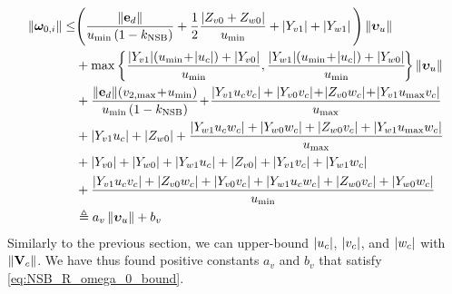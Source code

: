 \begin{equation}
\begin{split}
    \norm{\bs{\omega}_{0, i}} \leq &
    \Bigg(\frac{\norm{\mat{e}_d}}{u_{\min}\left(1 - k_{\rm NSB}\right)}
    + \frac{1}{2}\frac{\abs{Z_{v0} + Z_{w0}}}{u_{\min}} + \abs{Y_{v1}} + \abs{Y_{w1}}\Bigg) \norm{\bvel_u} \\
    &+ \max\left\{\frac{\abs{Y_{v1}}\!\left(u_{\min}\!+\!\abs{u_c}\right) + \abs{Y_{v0}}}{u_{\min}}, \frac{\abs{Y_{w1}}\!\left(u_{\min}\!+\!\abs{u_c}\right) + \abs{Y_{w0}}}{u_{\min}}\!\right\} \norm{\bvel_u} \\
    &+ \frac{\norm{\mat{e}_d}\!\left(\ivels_{2, \max}\! + \!u_{\min}\right)}{u_{\min}\left(1 - k_{\rm NSB}\right)}
    \!+\! \frac{\abs{Y_{v1}u_cv_c} + \abs{Y_{v0}v_c}\! + \!\abs{Z_{v0}w_c}\! + \!\abs{Y_{v1}u_{\max}v_c}}{u_{\max}} \\
    & + \abs{Y_{v1}u_c} + \abs{Z_{w0}} + \frac{\abs{Y_{w1}u_cw_c} + \abs{Y_{w0}w_c} + \abs{Z_{w0}v_c} + \abs{Y_{w1}u_{\max}w_c}}{u_{\max}} \\
    & + \abs{Y_{v0}} + \abs{Y_{w0}} + \abs{Y_{w1}u_c} + \abs{Z_{v0}} + \abs{Y_{v1}v_c} + \abs{Y_{w1}w_c} \\
    & + \frac{\abs{Y_{v1}u_cv_c} + \abs{Z_{v0}w_c} + \abs{Y_{v0}v_c} + \abs{Y_{w1}u_cw_c} + \abs{Z_{w0}v_c} + \abs{Y_{w0}w_c}}{u_{\min}} \\
    & \triangleq a_v\norm{\bvel_u} + b_v
\end{split}
\end{equation}
Similarly to the previous section, we can upper-bound $\left|u_c\right|$, $\left|v_c\right|$, and $\left|w_c\right|$ with $\left\|\mathbf{V}_c\right\|$.
We have thus found positive constants $a_v$ and $b_v$ that satisfy \eqref{eq:NSB_R_omega_0_bound}.
